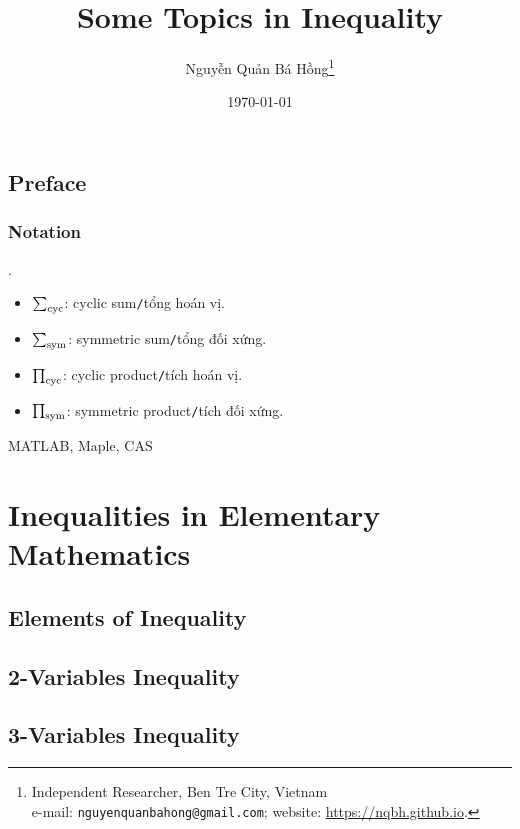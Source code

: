 \documentclass[oneside]{book}
\title{Some Topics in Inequality}
\author{\selectlanguage{vietnamese} Nguyễn Quản Bá Hồng\footnote{Independent Researcher, Ben Tre City, Vietnam\\e-mail: \texttt{nguyenquanbahong@gmail.com}; website: \url{https://nqbh.github.io}.}}
\date{\today}
\numberwithin{equation}{section}
\begin{document}
\maketitle
\setcounter{secnumdepth}{4}
\setcounter{tocdepth}{4}
\tableofcontents


\chapter*{Preface}

\section*{Notation}
\cite{Anh_Quang2022}.
\begin{itemize}
	\item $\sum_{\rm cyc}$: cyclic sum\texttt{/}tổng hoán vị.
	\item $\sum_{\rm sym}$: symmetric sum\texttt{/}tổng đối xứng.
	\item $\prod_{\rm cyc}$: cyclic product\texttt{/}tích hoán vị.
	\item $\prod_{\rm sym}$: symmetric product\texttt{/}tích đối xứng.
\end{itemize}
MATLAB, Maple, CAS


\part{Inequalities in Elementary Mathematics}

\chapter{Elements of Inequality}


\chapter{2-Variables Inequality}


\chapter{3-Variables Inequality}
\end{document}
